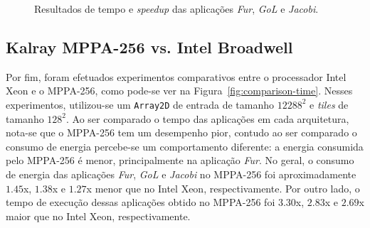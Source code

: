 \documentclass[12pt]{article}
\newcommand{\mppa}{MPPA-256\xspace}
\begin{document}
\begin{figure}[t]
	\centering
	\qquad
    \caption{Resultados de tempo e \textit{speedup} das aplicações \textit{Fur}, \textit{GoL} e \textit{Jacobi}.}
    \label{fig:scalability}
\end{figure}

\subsection{Kalray \mppa vs. Intel Broadwell}

Por fim, foram efetuados experimentos comparativos entre o processador Intel
Xeon e o \mppa, como pode-se ver na Figura~\ref{fig:comparison-time}. Nesses
experimentos, utilizou-se um \texttt{Array2D} de entrada de tamanho $12288^2$ e
\textit{tiles} de tamanho $128^2$. Ao ser comparado o tempo das aplicações em
cada arquitetura, nota-se que o \mppa tem um desempenho pior, contudo ao ser
comparado o consumo de energia percebe-se um comportamento diferente: a energia
consumida pelo \mppa é menor, principalmente na aplicação \textit{Fur}. No
geral, o consumo de energia das aplicações \textit{Fur}, \textit{GoL} e
\textit{Jacobi} no \mppa foi aproximadamente $1.45$x, $1.38$x e $1.27$x menor
que no Intel Xeon, respectivamente. Por outro lado, o tempo de execução dessas
aplicações obtido no \mppa foi  $3.30$x, $2.83$x e $2.69$x maior que no Intel
Xeon, respectivamente.
\end{document}

